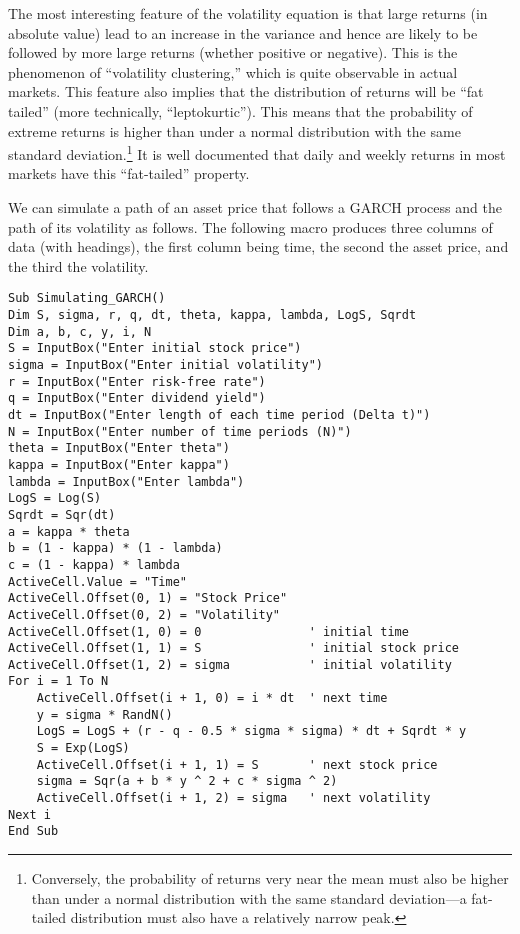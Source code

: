 The most interesting feature of the volatility equation is that large returns (in absolute value) lead to an increase in the variance and hence are likely to be followed by more large returns (whether positive or negative).  This is the phenomenon of ``volatility clustering,''  which is quite observable in actual markets.  This feature also implies that the distribution of returns will be ``fat tailed''  (more technically, ``leptokurtic'').   This means that the probability of extreme returns is higher than under a normal distribution with the same standard deviation.\footnote{Conversely, the probability of returns very near the mean must also be higher than under a normal distribution with the same standard deviation---a fat-tailed distribution must also have a relatively narrow peak.}  It is well documented that daily and weekly returns in most markets have this ``fat-tailed'' property.

We can simulate a path of an asset price that follows a GARCH process and the path of its volatility as follows.  The following macro produces three columns of data (with headings), the first column being time, the second  the asset price, and the third  the volatility.

\small\begin{verbatim}
Sub Simulating_GARCH()
Dim S, sigma, r, q, dt, theta, kappa, lambda, LogS, Sqrdt
Dim a, b, c, y, i, N
S = InputBox("Enter initial stock price")
sigma = InputBox("Enter initial volatility")
r = InputBox("Enter risk-free rate")
q = InputBox("Enter dividend yield")
dt = InputBox("Enter length of each time period (Delta t)")
N = InputBox("Enter number of time periods (N)")
theta = InputBox("Enter theta")
kappa = InputBox("Enter kappa")
lambda = InputBox("Enter lambda")
LogS = Log(S)
Sqrdt = Sqr(dt)
a = kappa * theta
b = (1 - kappa) * (1 - lambda)
c = (1 - kappa) * lambda
ActiveCell.Value = "Time"
ActiveCell.Offset(0, 1) = "Stock Price"
ActiveCell.Offset(0, 2) = "Volatility"
ActiveCell.Offset(1, 0) = 0               ' initial time
ActiveCell.Offset(1, 1) = S               ' initial stock price
ActiveCell.Offset(1, 2) = sigma           ' initial volatility
For i = 1 To N
    ActiveCell.Offset(i + 1, 0) = i * dt  ' next time
    y = sigma * RandN()
    LogS = LogS + (r - q - 0.5 * sigma * sigma) * dt + Sqrdt * y
    S = Exp(LogS)
    ActiveCell.Offset(i + 1, 1) = S       ' next stock price
    sigma = Sqr(a + b * y ^ 2 + c * sigma ^ 2)
    ActiveCell.Offset(i + 1, 2) = sigma   ' next volatility
Next i
End Sub
\end{verbatim}\normalsize


